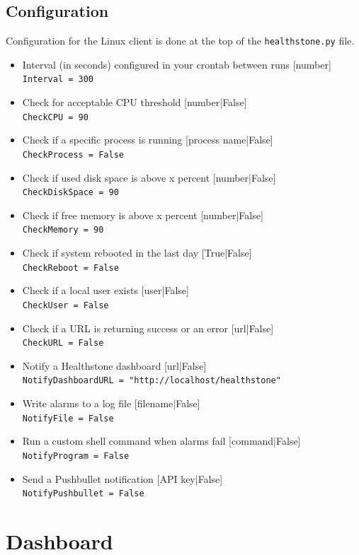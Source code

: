 \documentclass[11pt]{article}
\begin{document}
\subsection{Configuration}

Configuration for the Linux client is done at the top of the \texttt{healthstone.py} file.

\begin{itemize}
\item Interval (in seconds) configured in your crontab between runs [number]\\
\texttt{Interval = 300}
\item Check for acceptable CPU threshold [number|False]\\
\texttt{CheckCPU = 90}
\item Check if a specific process is running [process name|False]\\
\texttt{CheckProcess = False}
\item Check if used disk space is above x percent [number|False]\\
\texttt{CheckDiskSpace = 90}
\item Check if free memory is above x percent [number|False]\\
\texttt{CheckMemory = 90}
\item Check if system rebooted in the last day [True|False]\\
\texttt{CheckReboot = False}
\item Check if a local user exists [user|False]\\
\texttt{CheckUser = False}
\item Check if a URL is returning success or an error [url|False]\\
\texttt{CheckURL = False}
\item Notify a Healthstone dashboard [url|False]\\
\texttt{NotifyDashboardURL = "http://localhost/healthstone"}
\item Write alarms to a log file [filename|False]\\
\texttt{NotifyFile = False}
\item Run a custom shell command when alarms fail [command|False]\\
\texttt{NotifyProgram = False}
\item Send a Pushbullet notification [API key|False]\\
\texttt{NotifyPushbullet = False}
\end{itemize}


\section{Dashboard}
\end{document}
